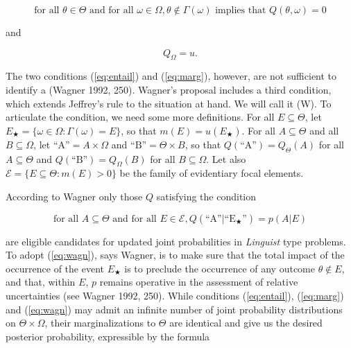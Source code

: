 \documentclass[11pt]{article}
\begin{document}
\begin{equation}
  \label{eq:entail}
  \mbox{for all }\theta\in\Theta\mbox{ and for all
  }\omega\in\Omega,\theta\notin\Gamma(\omega)\mbox{ implies that }Q(\theta,\omega)=0
\end{equation}

and

\begin{equation}
  \label{eq:marg}
  Q_{\Omega}=u.
\end{equation}

The two conditions (\ref{eq:entail}) and (\ref{eq:marg}), however, are
not sufficient to identify a  (Wagner 1992, 250). Wagner's proposal includes a third
condition, which extends Jeffrey's rule to the situation at hand. We
will call it (W). To articulate the condition, we need some more
definitions. For all $E\subseteq{}\Theta$, let
$E_{\bigstar}=\{\omega\in\Omega:\Gamma(\omega)=E\}$, so that
$m(E)=u(E_{\bigstar})$. For all $A\subseteq\Theta$ and all
$B\subseteq\Omega$, let $\mbox{``A''}=A\times\Omega$ and
$\mbox{``B''}=\Theta\times{}B$, so that
$Q(\mbox{``A''})=Q_{\Theta}(A)$ for all $A\subseteq\Theta$ and
$Q(\mbox{``B''})=Q_{\Omega}(B)$ for all $B\subseteq\Omega$. Let also
$\mathcal{E}=\{E\subseteq\Theta:m(E)>0\}$ be the family of evidentiary
focal elements.

According to Wagner only those $Q$ satisfying the condition

\begin{equation}
  \label{eq:wagn}
  \mbox{for all }A\subseteq\Theta\mbox{ and for all }E\in\mathcal{E},Q(\mbox{``A''}|\mbox{``E$_{\bigstar}$''})=p(A|E)
\end{equation}

are eligible candidates for updated joint probabilities in
\emph{Linguist} type problems. 
To adopt (\ref{eq:wagn}), says Wagner, is to make sure
that the total impact of the occurrence of the event $E_{\bigstar}$ is
to preclude the occurrence of any outcome $\theta\notin{}E$, and that,
within $E$, $p$ remains operative in the assessment of relative
uncertainties (see Wagner 1992, 250). While conditions
(\ref{eq:entail}), (\ref{eq:marg}) and (\ref{eq:wagn}) may admit an
infinite number of joint probability distributions on
$\Theta\times\Omega$, their marginalizations to $\Theta$ are identical
and give us the desired posterior probability, expressible by the
formula
\end{document}
